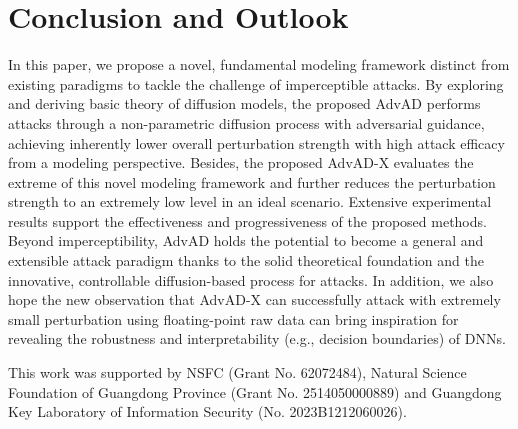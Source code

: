 \documentclass{article}
\begin{document}
\section{Conclusion and Outlook}
In this paper, we propose a novel, fundamental modeling framework distinct from existing paradigms to tackle the challenge of imperceptible attacks. By exploring and deriving basic theory of diffusion models, the proposed AdvAD performs attacks through a non-parametric diffusion process with adversarial guidance, achieving inherently lower overall perturbation strength with high attack efficacy from a modeling perspective. Besides, the proposed AdvAD-X evaluates the extreme of this novel modeling framework and further reduces the perturbation strength to an extremely low level in an ideal scenario. Extensive experimental results support the effectiveness and progressiveness of the proposed methods. 
Beyond imperceptibility, AdvAD holds the potential to become a general and extensible attack paradigm thanks to the solid theoretical foundation and the innovative, controllable diffusion-based process for attacks. 
In addition, we also hope the new observation that AdvAD-X can successfully attack with extremely small perturbation using floating-point raw data can bring inspiration for revealing the robustness and interpretability (e.g., decision boundaries) of DNNs.

\begin{ack}
This work was supported by NSFC (Grant No. 62072484), Natural Science Foundation of Guangdong Province (Grant No. 2514050000889) and Guangdong Key Laboratory of Information Security (No. 2023B1212060026).
\end{ack}



\small








\newpage

\normalsize
\appendix

\renewcommand{\arraystretch}{0.6}
\setlength{\aboverulesep}{1.25pt} 
\setlength{\belowrulesep}{1.25pt} 

\end{document}
